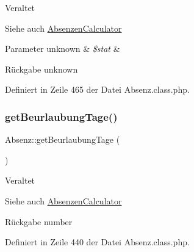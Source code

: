 \begin{DoxyRefDesc}{Veraltet}
\item[\mbox{\hyperlink{deprecated__deprecated000013}{Veraltet}}]\end{DoxyRefDesc}
\begin{DoxySeeAlso}{Siehe auch}
\mbox{\hyperlink{class_absenzen_calculator}{Absenzen\+Calculator}} 
\end{DoxySeeAlso}

\begin{DoxyParams}[1]{Parameter}
unknown & {\em \$stat} & \\
\hline
\end{DoxyParams}
\begin{DoxyReturn}{Rückgabe}
unknown 
\end{DoxyReturn}


Definiert in Zeile 465 der Datei Absenz.\+class.\+php.

\mbox{\label{class_absenz_a9ffcc8544b8cebbe9256a9d848497c61}} 
\subsubsection{\texorpdfstring{get\+Beurlaubung\+Tage()}{getBeurlaubungTage()}}
{\footnotesize\ttfamily Absenz\+::get\+Beurlaubung\+Tage (\begin{DoxyParamCaption}{ }\end{DoxyParamCaption})}

\begin{DoxyRefDesc}{Veraltet}
\item[\mbox{\hyperlink{deprecated__deprecated000012}{Veraltet}}]\end{DoxyRefDesc}
\begin{DoxySeeAlso}{Siehe auch}
\mbox{\hyperlink{class_absenzen_calculator}{Absenzen\+Calculator}} 
\end{DoxySeeAlso}
\begin{DoxyReturn}{Rückgabe}
number 
\end{DoxyReturn}


Definiert in Zeile 440 der Datei Absenz.\+class.\+php.

\mbox{\label{class_absenz_a989ac363723e8de5ad94d494fa03f640}} 
